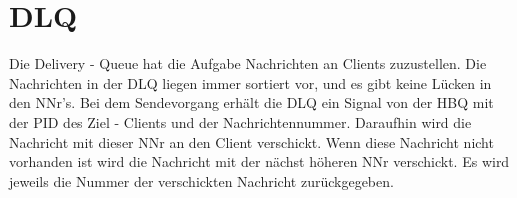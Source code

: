 \documentclass{scrreprt}
\begin{document}
\section{DLQ}
Die Delivery - Queue hat die Aufgabe Nachrichten an Clients zuzustellen. Die Nachrichten in der DLQ liegen immer sortiert vor, und es gibt keine Lücken in den NNr’s.
Bei dem Sendevorgang erhält die DLQ ein Signal von der HBQ mit der PID des Ziel - Clients und der Nachrichtennummer. Daraufhin wird die Nachricht mit dieser NNr an den Client verschickt.
Wenn diese Nachricht nicht vorhanden ist wird die Nachricht mit der nächst höheren NNr verschickt. Es wird jeweils die Nummer der verschickten Nachricht zurückgegeben.
\end{document}
